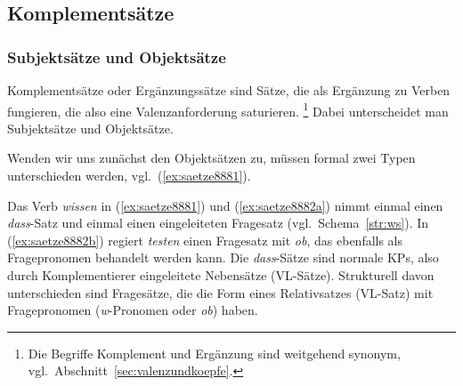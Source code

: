 \subsection{Komplementsätze}

\label{sec:komplementsaetze}

\subsubsection{Subjektsätze und Objektsätze}

\label{sec:subjobjsatz}

Komplementsätze oder Ergänzungssätze sind Sätze, die als Ergänzung zu Verben fungieren, die also eine Valenzanforderung saturieren.%
\footnote{Die Begriffe Komplement und Ergänzung sind weitgehend synonym, vgl.\ Abschnitt~\ref{sec:valenzundkoepfe}.}
Dabei unterscheidet man Subjektsätze und Objektsätze.


Wenden wir uns zunächst den Objektsätzen zu, müssen formal zwei Typen unterschieden werden, vgl.\ (\ref{ex:saetze8881}).


\begin{exe}
  \ex\label{ex:saetze8882}
  \begin{xlist}
  \end{xlist}
\end{exe}

Das Verb \textit{wissen} in (\ref{ex:saetze8881}) und (\ref{ex:saetze8882a}) nimmt einmal einen \textit{dass}-Satz und einmal einen eingeleiteten Fragesatz (vgl.\ Schema~\ref{str:ws}).
In (\ref{ex:saetze8882b}) regiert \textit{testen} einen Fragesatz mit \textit{ob}, das ebenfalls als Fragepronomen behandelt werden kann.
Die \textit{dass}-Sätze sind normale KPs, also durch Komplementierer eingeleitete Nebensätze (VL-Sätze).
Strukturell davon unterschieden sind Fragesätze, die die Form eines Relativsatzes (VL-Satz) mit Fragepronomen (\textit{w}-Pronomen oder \textit{ob}) haben.

